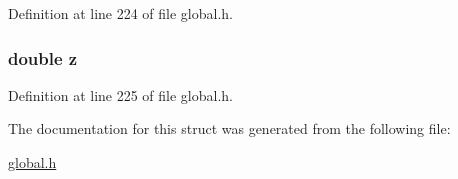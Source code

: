 Definition at line 224 of file global.\-h.

\hypertarget{structdoubleVector3d_ab3e6ed577a7c669c19de1f9c1b46c872}{
\subsubsection[{z}]{\setlength{\rightskip}{0pt plus 5cm}double z}}\label{structdoubleVector3d_ab3e6ed577a7c669c19de1f9c1b46c872}


Definition at line 225 of file global.\-h.



The documentation for this struct was generated from the following file\-:\begin{DoxyCompactItemize}
\item 
\hyperlink{global_8h}{global.\-h}\end{DoxyCompactItemize}
